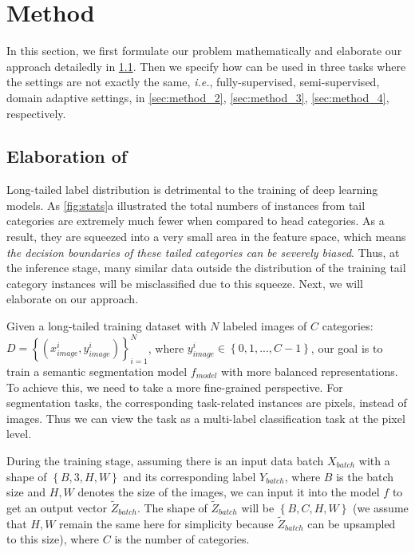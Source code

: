 \section{Method}\label{sec:method}

In this section, we first formulate our problem mathematically and elaborate our approach detailedly in \cref{sec:method_1}.
%
Then we specify how \method can be used in three tasks where the settings are not exactly the same, \textit{i.e.}, fully-supervised, semi-supervised, domain adaptive settings, in \cref{sec:method_2}, \cref{sec:method_3}, \cref{sec:method_4}, respectively.


\subsection{Elaboration of \method}\label{sec:method_1}
Long-tailed label distribution is detrimental to the training of deep learning models.
%
As \cref{fig:stats}a illustrated the total numbers of instances from tail categories are extremely much fewer when compared to head categories.
%
As a result, they are squeezed into a very small area in the feature space,
%
which means \textit{the decision boundaries of these tailed categories can be severely biased}.
%
Thus, at the inference stage, many similar data outside the distribution of the training tail category instances will be misclassified due to this squeeze.
%
Next, we will elaborate on our approach.


Given a long-tailed training dataset with $N$ labeled images of $C$ categories: $D=\left\{(x_{image}^{i}, y_{image}^{i})\right\}_{i=1}^{N}$, where $y_{image}^{i}\in \left\{0, 1, ..., C-1\right\}$,  
%
our goal is to train a semantic segmentation model $f_{model}$ with more balanced representations.
%
To achieve this, we need to take a more fine-grained perspective.
%
For segmentation tasks, the corresponding task-related instances are pixels, instead of images.
%
Thus we can view the task as a multi-label classification task at the pixel level.
%

%
During the training stage, assuming there is an input data batch $X_{batch}$ with a shape of $\left\{B, 3, H, W\right\}$ and its corresponding label $Y_{batch}$, where $B$ is the batch size and $H, W$ denotes the size of the images, we can input it into the model $f$ to get an output vector $\tilde{Z}_{batch}$.
%
The shape of $\tilde{Z}_{batch}$ will be $\left\{B, C, H, W\right\}$ (we assume that $H, W$ remain the same here for simplicity because $\tilde{Z}_{batch}$ can be upsampled to this size), where $C$ is the number of categories.
%

